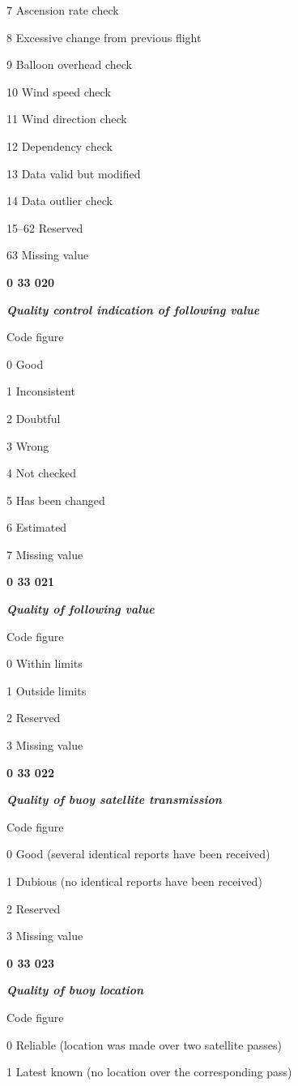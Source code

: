 7 Ascension rate check

8 Excessive change from previous flight

9 Balloon overhead check

10 Wind speed check

11 Wind direction check

12 Dependency check

13 Data valid but modified

14 Data outlier check

15--62 Reserved

63 Missing value

\textbf{0 33 020}

\emph{\textbf{Quality control indication of following value}}

Code figure

0 Good

1 Inconsistent

2 Doubtful

3 Wrong

4 Not checked

5 Has been changed

6 Estimated

7 Missing value

\textbf{0 33 021}

\emph{\textbf{Quality of following value}}

Code figure

0 Within limits

1 Outside limits

2 Reserved

3 Missing value

\textbf{0 33 022}

\emph{\textbf{Quality of buoy satellite transmission}}

Code figure

0 Good (several identical reports have been received)

1 Dubious (no identical reports have been received)

2 Reserved

3 Missing value

\textbf{0 33 023}

\emph{\textbf{Quality of buoy location}}

Code figure

0 Reliable (location was made over two satellite passes)

1 Latest known (no location over the corresponding pass)

